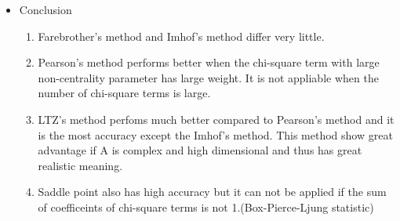 \documentclass[10pt]{beamer}
\begin{document}
\begin{frame}
	\begin{itemize}
		\item Conclusion
		\small
		\begin{enumerate}
		\item Farebrother's method and Imhof's method differ very little.
		\item Pearson's method performs better when the chi-square term with large non-centrality parameter has large weight. It is not appliable when the number of chi-square terms is large.
       \item LTZ's method perfoms much better compared to Pearson's method and it is the most accuracy except the Imhof's method. This method show great advantage if A is complex and high dimensional and thus has great realistic meaning.
       \item Saddle point also has high accuracy but it can not be applied if the sum of coefficeints of chi-square terms is not 1.(Box-Pierce-Ljung statistic)
    \end{enumerate}
\end{itemize}
	
\end{frame}
\end{document}
